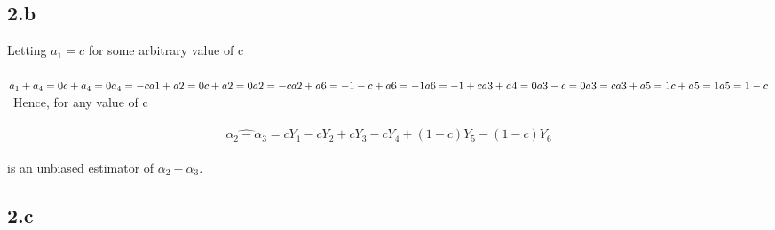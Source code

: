 \documentclass[11pt]{article}   	%
\begin{document}
\subsection*{2.b}

Letting $ a_1 = c $ for some arbitrary value of c \\
\\
$
a_1 + a_4 = 0 \\
c + a_4 = 0 \\
a_4 = -c \\
\\
a1 + a2 = 0 \\
c + a2 = 0 \\
a2 = -c \\
\\
a2 + a6 = -1 \\
-c + a6 = -1 \\
a6 = -1 + c \\
\\
a3 + a4 = 0 \\
a3 - c = 0 \\
a3 = c \\
\\
a3 + a5 = 1 \\
c + a5 = 1 \\
a5 = 1 - c \\
$
\
Hence, for any value of c \\
\
\[ \widehat{ \alpha_2 - \alpha_3 } = cY_1 - cY_2 +cY_3 - cY_4 + (1 - c)Y_5 - (1 - c)Y_6 \]
\\
is an unbiased estimator of $ \alpha_2 - \alpha_3 $.


\subsection*{2.c}
\end{document}
